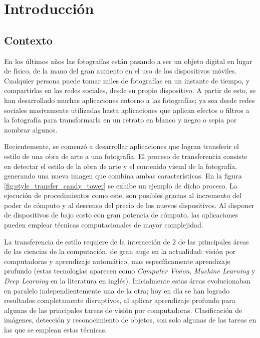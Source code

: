 \documentclass[a4paper,11pt,spanish]{book}
\begin{document}
\tableofcontents

\chapter{Introducción}
  \section {Contexto}
    En los últimos años las fotografías están pasando a ser un objeto digital en lugar de físico, de la mano del gran aumento en el uso de los dispositivos móviles.
    Cualquier persona puede tomar miles de fotografías en un instante de tiempo, y compartirlas en las redes sociales, desde su propio dispositivo.
    A partir de esto, se han desarrollado muchas aplicaciones entorno a las fotografías; ya sea desde redes sociales masivamente utilizadas hasta aplicaciones que aplican 
    efectos o filtros a la fotografía para transformarla en un retrato en blanco y negro o sepia por nombrar algunos.

    Recientemente, se comenzó a desarrollar aplicaciones que logran transferir el estilo de una obra de arte a una fotografía.
    El proceso de transferencia consiste en detectar el estilo de la obra de arte y el contenido visual de la fotografía, generando una nueva imagen que combina 
    ambas características. En la figura \ref{fig:style_transfer_candy_tower} se exhibe un ejemplo de dicho proceso.
    La ejecución de procedimientos como este, son posibles gracias al incremento del poder de cómputo y al descenso del precio de los nuevos dispositivos. 
    Al disponer de dispositivos de bajo costo con gran potencia de cómputo, las aplicaciones pueden emplear técnicas computacionales de mayor complejidad.

    La transferencia de estilo requiere de la interacción de 2 de las principales áreas de las ciencias de la computación, de gran auge en la actualidad: 
    visión por computadoras y aprendizaje automático, mas específicamente aprendizaje profundo 
    (estas tecnologías aparecen como \emph{Computer Vision}, \emph{Machine Learning} y \emph{Deep Learning} en la literatura en inglés).
    Inicialmente estas áreas evolucionaban en paralelo independientemente una de la otra; hoy en día se han logrado resultados completamente disruptivos, al aplicar
    aprendizaje profundo para algunas de las principales tareas de visión por computadoras.
    Clasificación de imágenes, detección y reconocimiento de objetos, son solo algunas de las tareas en las que se emplean estas técnicas.
\end{document}

